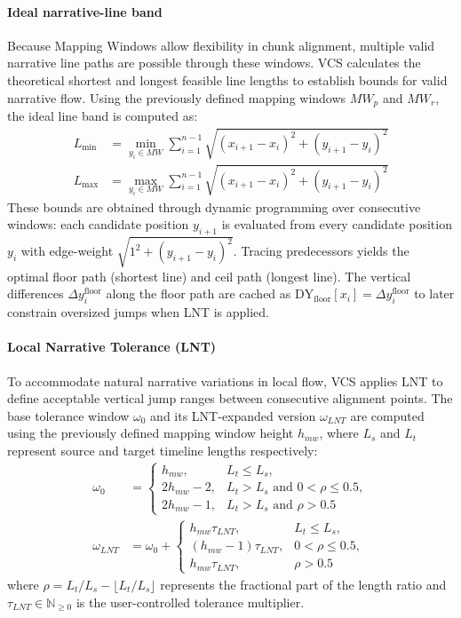 \documentclass[main.tex]{subfiles}
\begin{document}
\paragraph{Ideal narrative-line band}
Because Mapping Windows allow flexibility in chunk alignment, multiple valid narrative line paths are possible through these windows. VCS calculates the theoretical shortest and longest feasible line lengths to establish bounds for valid narrative flow. Using the previously defined mapping windows $MW_p$ and $MW_r$, the ideal line band is computed as:
\begin{align}
L_{\min} &= \min_{y_i \in MW} \sum_{i=1}^{n-1} \sqrt{(x_{i+1} - x_i)^2 + (y_{i+1} - y_i)^2} \\
L_{\max} &= \max_{y_i \in MW} \sum_{i=1}^{n-1} \sqrt{(x_{i+1} - x_i)^2 + (y_{i+1} - y_i)^2}
\end{align}
These bounds are obtained through dynamic programming over consecutive windows: each candidate position $y_{i+1}$ is evaluated from every candidate position $y_i$ with edge-weight $\sqrt{1^2 + (y_{i+1} - y_i)^2}$. Tracing predecessors yields the optimal floor path (shortest line) and ceil path (longest line). The vertical differences $\Delta y_i^{\text{floor}}$ along the floor path are cached as $\text{DY}_{\text{floor}}[x_i] = \Delta y_i^{\text{floor}}$ to later constrain oversized jumps when LNT is applied.

\paragraph{Local Narrative Tolerance (LNT)}
To accommodate natural narrative variations in local flow, VCS applies LNT to define acceptable vertical jump ranges between consecutive alignment points. The base tolerance window $\omega_0$ and its LNT-expanded version $\omega_{LNT}$ are computed using the previously defined mapping window height $h_{mw}$, where $L_s$ and $L_t$ represent source and target timeline lengths respectively:
\begin{align}
\omega_0 &= \begin{cases}
h_{mw}, & L_t \leq L_s, \\
2h_{mw} - 2, & L_t > L_s \text{ and } 0 < \rho \leq 0.5, \\
2h_{mw} - 1, & L_t > L_s \text{ and } \rho > 0.5
\end{cases} \\
\omega_{LNT} &= \omega_0 + \begin{cases}
h_{mw} \tau_{LNT}, & L_t \leq L_s, \\
(h_{mw} - 1) \tau_{LNT}, & 0 < \rho \leq 0.5, \\
h_{mw} \tau_{LNT}, & \rho > 0.5
\end{cases}
\end{align}
where $\rho = L_t/L_s - \lfloor L_t/L_s \rfloor$ represents the fractional part of the length ratio and $\tau_{LNT} \in \mathbb{N}_{\geq 0}$ is the user-controlled tolerance multiplier.
\end{document}
